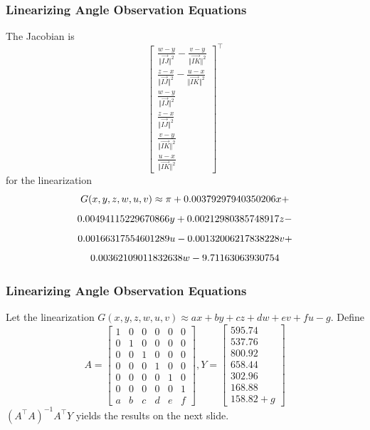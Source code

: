 \documentclass[xcolor=dvipsnames]{beamer}
\begin{document}
\begin{frame}
  \frametitle{Linearizing Angle Observation Equations}
  The Jacobian is
  \begin{equation}
    \label{eq:eeleequo}
    \left[
      \begin{array}{c}
        \frac{w-y}{\Vert\vec{IJ}\Vert^{2}}-\frac{v-y}{\Vert\vec{IK}\Vert^{2}} \\
        \frac{z-x}{\Vert\vec{IJ}\Vert^{2}}-\frac{u-x}{\Vert\vec{IK}\Vert^{2}} \\
        \frac{w-y}{\Vert\vec{IJ}\Vert^{2}} \\
        \frac{z-x}{\Vert\vec{IJ}\Vert^{2}} \\
        \frac{v-y}{\Vert\vec{IK}\Vert^{2}} \\
        \frac{u-x}{\Vert\vec{IK}\Vert^{2}}
      \end{array}\right]^{\intercal}
  \end{equation}
  for the linearization
  \begin{equation}
    \label{eq:iiphiewi}
    G(x,y,z,w,u,v)\approx\pi+0.00379297940350206x+\notag
  \end{equation}
  \begin{equation}
    \label{eq:ciedaewe}
    0.00494115229670866y+0.00212980385748917z-\notag
  \end{equation}
  \begin{equation}
    \label{eq:ithaenga}
    0.00166317554601289u-0.00132006217838228v+\notag
  \end{equation}
  \begin{equation}
    \label{eq:sheidiiw}
    0.00362109011832638w-9.71163063930754\notag
  \end{equation}
\end{frame}

\begin{frame}
  \frametitle{Linearizing Angle Observation Equations}
Let the linearization
$G(x,y,z,w,u,v)\approx{}ax+by+cz+dw+ev+fu-g$. 
  Define
  \begin{equation}
    \label{eq:saexooph}
    A=\left[
      \begin{array}{cccccc}
        1&0&0&0&0&0 \\
        0&1&0&0&0&0 \\
        0&0&1&0&0&0 \\
        0&0&0&1&0&0 \\
        0&0&0&0&1&0 \\
        0&0&0&0&0&1 \\
        a&b&c&d&e&f
      \end{array}\right],Y=\left[
      \begin{array}{c}
595.74 \\
537.76 \\
800.92 \\
658.44 \\
302.96 \\
168.88 \\
158.82+g
      \end{array}\right]
  \end{equation}
  $(A^{\intercal}A)^{-1}A^{\intercal}Y$ yields the results on the
  next slide.
\end{frame}
\end{document}

